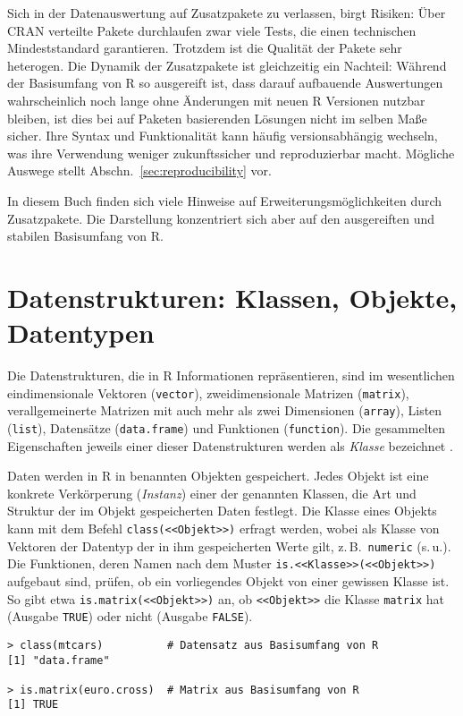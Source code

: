 Sich in der Datenauswertung auf Zusatzpakete zu verlassen, birgt Risiken: Über CRAN verteilte Pakete durchlaufen zwar viele Tests, die einen technischen Mindeststandard garantieren. Trotzdem ist die Qualität der Pakete sehr heterogen. Die Dynamik der Zusatzpakete ist gleichzeitig ein Nachteil: Während der Basisumfang von R so ausgereift ist, dass darauf aufbauende Auswertungen wahrscheinlich noch lange ohne Änderungen mit neuen R Versionen nutzbar bleiben, ist dies bei auf Paketen basierenden Lösungen nicht im selben Maße sicher. Ihre Syntax und Funktionalität kann häufig versionsabhängig wechseln, was ihre Verwendung weniger zukunftssicher und reproduzierbar macht. Mögliche Auswege stellt Abschn.\ \ref{sec:reproducibility} vor.

In diesem Buch finden sich viele Hinweise auf Erweiterungsmöglichkeiten durch Zusatzpakete. Die Darstellung konzentriert sich aber auf den ausgereiften und stabilen Basisumfang von R.

\section{Datenstrukturen: Klassen, Objekte, Datentypen}
\label{sec:objects}

Die Datenstrukturen, die in R Informationen repräsentieren, sind im wesentlichen eindimensionale Vektoren (\lstinline!vector!), zweidimensionale Matrizen (\lstinline!matrix!), verallgemeinerte Matrizen mit auch mehr als zwei Dimensionen (\lstinline!array!), Listen (\lstinline!list!), Datensätze (\lstinline!data.frame!) und Funktionen (\lstinline!function!). Die gesammelten Eigenschaften jeweils einer dieser Datenstrukturen werden als \emph{Klasse} bezeichnet \cite{Chambers2008, Wickham2014a}.

Daten werden in R in benannten Objekten gespeichert. Jedes Objekt ist eine konkrete Verkörperung (\emph{Instanz}) einer der genannten Klassen, die Art und Struktur der im Objekt gespeicherten Daten festlegt. Die Klasse eines Objekts kann mit dem Befehl \lstinline!class(<<Objekt>>)! erfragt werden, wobei als Klasse von Vektoren der Datentyp der in ihm gespeicherten Werte gilt, z.\,B.\ \lstinline!numeric! (s.\,u.). Die Funktionen, deren Namen nach dem Muster \lstinline!is.<<Klasse>>(<<Objekt>>)! aufgebaut sind, prüfen, ob ein vorliegendes Objekt von einer gewissen Klasse ist. So gibt etwa \lstinline!is.matrix(<<Objekt>>)! an, ob \lstinline!<<Objekt>>! die Klasse \lstinline!matrix! hat (Ausgabe \lstinline!TRUE!) oder nicht (Ausgabe \lstinline!FALSE!).
\begin{lstlisting}
> class(mtcars)          # Datensatz aus Basisumfang von R
[1] "data.frame"

> is.matrix(euro.cross)  # Matrix aus Basisumfang von R
[1] TRUE
\end{lstlisting}

